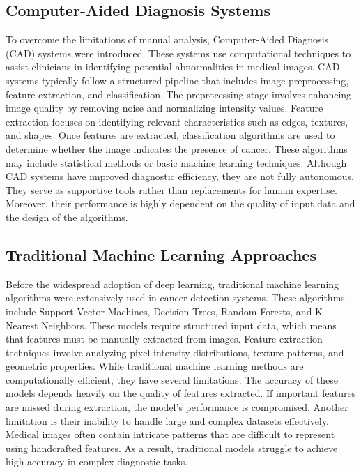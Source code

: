 \documentclass[a4paper,12pt]{report}
\begin{document}
\begin{doublespace}
\subsection{Computer-Aided Diagnosis Systems}
\label{sec:2.5}

To overcome the limitations of manual analysis, Computer-Aided Diagnosis (CAD) systems were introduced. These systems use computational techniques to assist clinicians in identifying potential abnormalities in medical images.
CAD systems typically follow a structured pipeline that includes image preprocessing, feature extraction, and classification. The preprocessing stage involves enhancing image quality by removing noise and normalizing intensity values. Feature extraction focuses on identifying relevant characteristics such as edges, textures, and shapes.
Once features are extracted, classification algorithms are used to determine whether the image indicates the presence of cancer. These algorithms may include statistical methods or basic machine learning techniques.
Although CAD systems have improved diagnostic efficiency, they are not fully autonomous. They serve as supportive tools rather than replacements for human expertise. Moreover, their performance is highly dependent on the quality of input data and the design of the algorithms.

\subsection{Traditional Machine Learning Approaches}
\label{sec:2.6}

Before the widespread adoption of deep learning, traditional machine learning algorithms were extensively used in cancer detection systems. These algorithms include Support Vector Machines, Decision Trees, Random Forests, and K-Nearest Neighbors.
These models require structured input data, which means that features must be manually extracted from images. Feature extraction techniques involve analyzing pixel intensity distributions, texture patterns, and geometric properties.
While traditional machine learning methods are computationally efficient, they have several limitations. The accuracy of these models depends heavily on the quality of features extracted. If important features are missed during extraction, the model’s performance is compromised.
Another limitation is their inability to handle large and complex datasets effectively. Medical images often contain intricate patterns that are difficult to represent using handcrafted features. As a result, traditional models struggle to achieve high accuracy in complex diagnostic tasks.


\end{doublespace}
\end{document}
